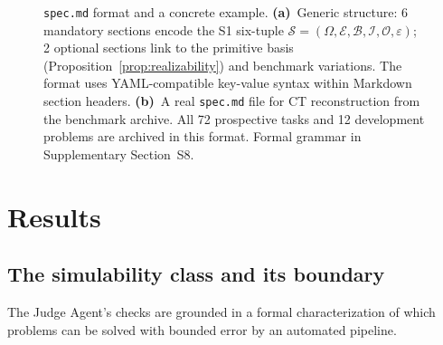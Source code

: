 \documentclass[11pt,a4paper]{article}
\newcommand{\Spec}{\mathcal{S}}
\newcommand{\Domain}{\Omega}
\begin{document}
\begin{figure}[htbp]
{%
}
\caption{\texttt{spec.md} format and a concrete example. \textbf{(a)}~Generic structure: 6 mandatory sections encode the S1 six-tuple $\Spec = (\Domain, \mathcal{E}, \mathcal{B}, \mathcal{I}, \mathcal{O}, \varepsilon)$; 2 optional sections link to the primitive basis (Proposition~\ref{prop:realizability}) and benchmark variations. The format uses YAML-compatible key-value syntax within Markdown section headers. \textbf{(b)}~A real \texttt{spec.md} file for CT reconstruction from the benchmark archive. All 72 prospective tasks and 12 development problems are archived in this format. Formal grammar in Supplementary Section~S8.}
\label{fig:specmd}
\end{figure}

\section{Results}

\subsection{The simulability class and its boundary}
\label{sec:sclass}

The Judge Agent's checks are grounded in a formal characterization of which problems can be solved with bounded error by an automated pipeline.
\end{document}
